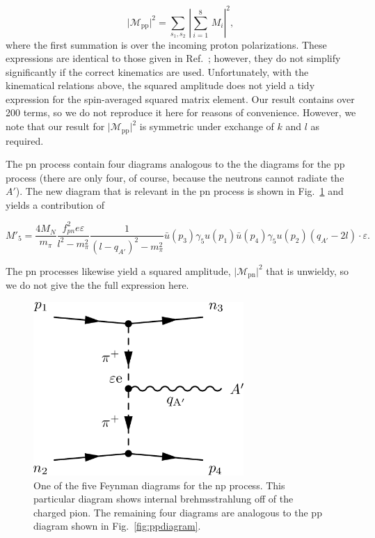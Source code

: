 \documentclass[nofootinbib,prd,superscriptaddress,twocolumn]{revtex4}
\newcommand{\qa}{q_{A'}}
\begin{document}
%
\begin{equation}
\vert \mathcal{M}_{\mathrm{pp}} \vert^2 = \sum_{s_1,s_2}\, \left\vert \sum_{i=1}^{8}\, M_i \right\vert^2, 
\end{equation}
%
where the first summation is over the incoming proton polarizations. These expressions are identical to those 
given in Ref.~\cite{dent_etal12}; however, they do not simplify significantly if the correct kinematics are used. 
Unfortunately, with the kinematical relations above, the squared amplitude does not yield a tidy expression 
for the spin-averaged squared matrix element. Our result 
contains over 200 terms, so we do not reproduce it here for reasons of convenience. However, we note that 
our result for $\vert \mathcal{M}_{\mathrm{pp}} \vert^2$ is symmetric under exchange of $k$ and $l$ as required. 

The pn process contain four diagrams analogous to the the diagrams for the pp process (there are only four, of course, 
because the neutrons cannot radiate the $A'$). The new diagram that is relevant in the pn process is shown in 
Fig.~\ref{fig:npdiagram} and yields a contribution of 
%
\begin{widetext}
\begin{equation}
M'_5 = \frac{4 M_N}{ m_\pi} \frac{f_{pn}^2 e \varepsilon}{l^2-m_\pi^2}  \frac{1}{(l-\qa)^2 - m_\pi^2} 
\bar{u}(p_3) \gamma_5 u(p_1) \bar{u}(p_4) \gamma_5 u(p_2) (\qa - 2l)\cdot \varepsilon.
\end{equation}
\end{widetext}
%
The pn processes likewise yield a squared amplitude, 
$\vert \mathcal{M}_{\mathrm{pn}} \vert^2$ that is unwieldy, so we do not give the 
the full expression here. 


\begin{figure}
\includegraphics[width=8cm]{npdiagram.pdf}
\caption{One of the five Feynman diagrams for the np process. This particular diagram shows 
internal brehmsstrahlung off of the charged pion. The remaining four diagrams are analogous to the 
pp diagram shown in Fig.~\ref{fig:ppdiagram}.}
\label{fig:npdiagram}
\end{figure}
\end{document}
